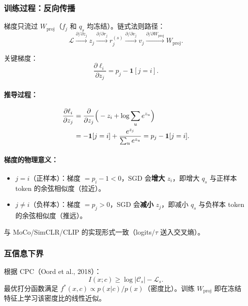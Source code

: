 \documentclass[11pt,a4paper]{article}
\theoremstyle{definition}
\begin{document}
\subsubsection{训练过程：反向传播}

梯度只流过 $W_{\mathrm{proj}}$（$f_j$ 和 $q_s$ 均冻结）。链式法则路径：
\[
\mathcal{L} \xrightarrow{\partial/\partial z_j} z_j
\xrightarrow{\partial/\partial r_j} r_j^{(s)}
\xrightarrow{\partial/\partial v_j} v_j
\xrightarrow{\partial/\partial W_{\mathrm{proj}}} W_{\mathrm{proj}}.
\]

关键梯度：
\begin{equation}\label{eq:grad}
\frac{\partial \ell_i}{\partial z_j} = p_j - \mathbf{1}[j = i].
\end{equation}

\paragraph{推导过程：}
\begin{align}
\frac{\partial \ell_i}{\partial z_j}
&= \frac{\partial}{\partial z_j}\Big(-z_i + \log \sum_u e^{z_u}\Big) \notag\\
&= -\mathbf{1}[j=i] + \frac{e^{z_j}}{\sum_u e^{z_u}} = p_j - \mathbf{1}[j=i].
\end{align}

\paragraph{梯度的物理意义：}
\begin{itemize}[nosep]
    \item $j=i$（正样本）：梯度 $= p_i - 1 < 0$，SGD 会\textbf{增大} $z_i$，即增大 $q_s$ 与正样本 token 的余弦相似度（拉近）。
    \item $j \neq i$（负样本）：梯度 $= p_j > 0$，SGD 会\textbf{减小} $z_j$，即减小 $q_s$ 与负样本 token 的余弦相似度（推远）。
\end{itemize}
与 MoCo/SimCLR/CLIP 的实现形式一致（logits$/\tau$ 送入交叉熵）。

\subsubsection{互信息下界}

根据 CPC（Oord et al., 2018）：
\begin{equation}
I(x; c) \geq \log |\mathcal{C}_s| - \mathcal{L}_s.
\end{equation}
最优打分函数满足 $f^*(x,c) \propto p(x|c)/p(x)$（密度比）。训练 $W_{\mathrm{proj}}$ 即在冻结特征上学习该密度比的线性近似。
\end{document}
